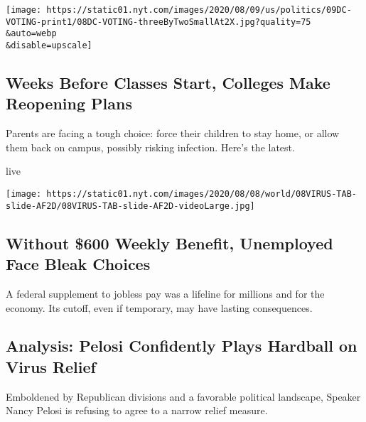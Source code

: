 \href{/2020/08/08/us/politics/voting-nov-3-election.html}{}

\texttt{[image: https://static01.nyt.com/images/2020/08/09/us/politics/09DC-VOTING-print1/08DC-VOTING-threeByTwoSmallAt2X.jpg?quality=75\\\&auto=webp\\\&disable=upscale]}

\href{/2020/08/08/world/coronavirus-updates.html}{}

\hypertarget{weeks-before-classes-start-colleges-make-reopening-plans}{%
\subsection{Weeks Before Classes Start, Colleges Make Reopening
Plans}\label{weeks-before-classes-start-colleges-make-reopening-plans}}

Parents are facing a tough choice: force their children to stay home, or
allow them back on campus, possibly risking infection. Here's the
latest.

live

\texttt{[image: https://static01.nyt.com/images/2020/08/08/world/08VIRUS-TAB-slide-AF2D/08VIRUS-TAB-slide-AF2D-videoLarge.jpg]}

\href{/2020/08/08/business/economy/lost-unemployment-benefits.html}{}

\hypertarget{without-600-weekly-benefit-unemployed-face-bleak-choices}{%
\subsection{Without \$600 Weekly Benefit, Unemployed Face Bleak
Choices}\label{without-600-weekly-benefit-unemployed-face-bleak-choices}}

A federal supplement to jobless pay was a lifeline for millions and for
the economy. Its cutoff, even if temporary, may have lasting
consequences.

\href{/2020/08/08/us/politics/nancy-pelosi-coronavirus-relief.html}{}

\hypertarget{analysis-pelosi-confidently-plays-hardball-on-virus-relief}{%
\subsection{Analysis: Pelosi Confidently Plays Hardball on Virus
Relief}\label{analysis-pelosi-confidently-plays-hardball-on-virus-relief}}

Emboldened by Republican divisions and a favorable political landscape,
Speaker Nancy Pelosi is refusing to agree to a narrow relief measure.

